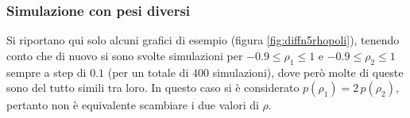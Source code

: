 \documentclass[a4paper,12pt,twoside,openright]{report}
\begin{document}
\subsubsection{Simulazione con pesi diversi}
\label{subsubsec:5dimrhopolidiff}
Si riportano qui solo alcuni grafici di esempio (figura \ref{fig:diffn5rhopoli}), tenendo conto che di nuovo si sono svolte simulazioni per $ -0.9 \le \rho_1 \le 1 $ e $ -0.9 \le \rho_2 \le 1 $ sempre a step di $0.1$ (per un totale di $400$ simulazioni), dove però molte di queste sono del tutto simili tra loro. In questo caso si è considerato $p(\rho_1)=2\,p(\rho_2)$, pertanto non è equivalente scambiare i due valori di $\rho$.
\begin{figure}[ht]
	\centering
	\newline

\end{figure}
\end{document}
